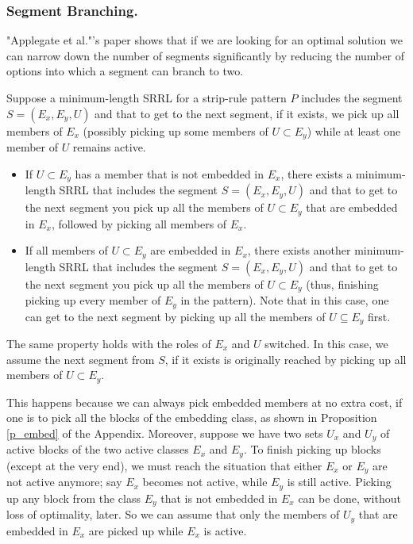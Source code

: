 \subsubsection{Segment Branching.}

"Applegate et al."'s paper \cite{ACJKLW07}
shows that if we are looking for an optimal solution we can narrow down the number of segments significantly by reducing the number of options into which a segment can branch to two.

Suppose a minimum-length SRRL for a strip-rule pattern $P$ includes the segment $S = (E_{x}, E_{y}, U)$ and that to get to the next segment, if it exists, we pick up all members of $E_{x}$
(possibly picking up some members of $U \subset E_{y}$)
while at least one member of $U$ remains active.

\begin{itemize}

\item If $U \subset E_{y}$ has a member that is not embedded in $E_{x}$,
 there exists a minimum-length SRRL that includes the segment
$S = (E_{x}, E_{y}, U)$ and that to get to the next segment you pick up
 all the members of $U \subset E_{y}$ that are embedded in $E_{x}$,
 followed by picking all members of $E_{x}$.

\item If all members of $U \subset E_{y}$ are embedded in $E_{x}$,
 there exists another minimum-length SRRL that includes the segment
$S = (E_{x}, E_{y}, U)$ and that to get to the next segment you
 pick up all the members of $U \subset E_{y}$
(thus, finishing picking up every member of $E_{y}$ in the pattern).
Note that in this case, one can get to the next segment by picking up all
the members of $U \subseteq E_y$ first.

\end{itemize}

The same property holds with the roles of $E_{x}$ and $U$ switched. In this case, we assume the next segment from $S$, if it exists is originally reached by picking up all members of $U \subset E_{y}$.

This happens because we can always pick embedded members at no extra cost,
if one is to pick all the blocks of the embedding class, as shown in
Proposition \ref{p_embed} of the Appendix.
Moreover, suppose we have two sets $U_x$ and $U_y$
of active blocks of the two active classes $E_x$ and $E_y$.
To finish picking up blocks (except at the very end), we must
reach the situation that either $E_x$ or $E_y$ are not active anymore;
say $E_x$ becomes not active, while $E_y$ is still active.
Picking up any block from the class $E_y$ that is not embedded in $E_x$
can be done, without loss of optimality, later.
So we can assume that
 only the members of $U_y$ that are embedded in $E_x$ are picked up
while $E_x$ is active.

